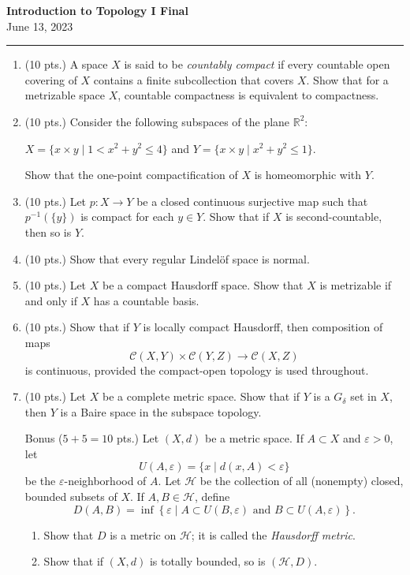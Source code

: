 \documentclass[12pt]{report}
\newcommand{\ra}{\rightarrow}
\newcommand{\inv}{^{-1}}
\newcommand{\R}{\mathbb{R}}
\newcommand{\mc}[1]{\mathcal{#1}}
\renewcommand{\epsilon}{\varepsilon}
\begin{document}
\begin{center}
    \textbf{\large Introduction to Topology I Final}\\
    June 13, 2023
\end{center}

\hrule
\begin{enumerate}
    \item (10 pts.) A space \(X\) is said to be \textit{countably compact} if every countable open covering of \(X\) contains a finite subcollection that covers \(X\). Show that for a metrizable space \(X\), countable compactness is equivalent to compactness.

    \item (10 pts.) Consider the following subspaces of the plane \(\R^2\):
          \begin{center}
              \(X = \{x \times y \mid 1 < x^2 + y^2 \leq 4\}\) \quad and \quad \(Y = \{x \times y \mid x^2 + y^2 \leq 1\}\).
          \end{center}
          Show that the one-point compactification of \(X\) is homeomorphic with \(Y\).

    \item (10 pts.) Let \(p : X \ra Y\) be a closed continuous surjective map such that \(p\inv(\{y\})\) is compact for each \(y \in Y\). Show that if \(X\) is second-countable, then so is \(Y\).

    \item (10 pts.) Show that every regular Lindelöf space is normal.

    \item (10 pts.) Let \(X\) be a compact Hausdorff space. Show that \(X\) is metrizable if and only if \(X\) has a countable basis.

    \item (10 pts.) Show that if \(Y\) is locally compact Hausdorff, then composition of maps
          \[
              \mc{C}(X, Y) \times \mc{C}(Y, Z) \ra \mc{C}(X, Z)
          \]
          is continuous, provided the compact-open topology is used throughout.

    \item (10 pts.) Let \(X\) be a complete metric space. Show that if \(Y\) is a \(G_\delta\) set in \(X\), then \(Y\) is a Baire space in the subspace topology.

    \item[Bonus] (\(5 + 5 = 10\) pts.) Let \((X, d)\) be a metric space. If \(A \subset X\) and \(\epsilon > 0\), let
        \[
            U(A, \epsilon) = \{x \mid d(x, A) < \epsilon\}
        \]
        be the \(\epsilon\)-neighborhood of \(A\). Let \(\mc{H}\) be the collection of all (nonempty) closed, bounded subsets of \(X\). If \(A, B \in \mc{H}\), define
        \[
            D(A, B) = \inf\left\{\epsilon \mid A \subset U(B, \epsilon) \text{ and } B \subset U(A, \epsilon)\right\}.
        \]
        \begin{enumerate}
            \item Show that \(D\) is a metric on \(\mc{H}\); it is called the \textit{Hausdorff metric}.
            \item Show that if \((X, d)\) is totally bounded, so is \((\mc{H}, D)\).


\end{enumerate}
\end{enumerate}
\end{document}
